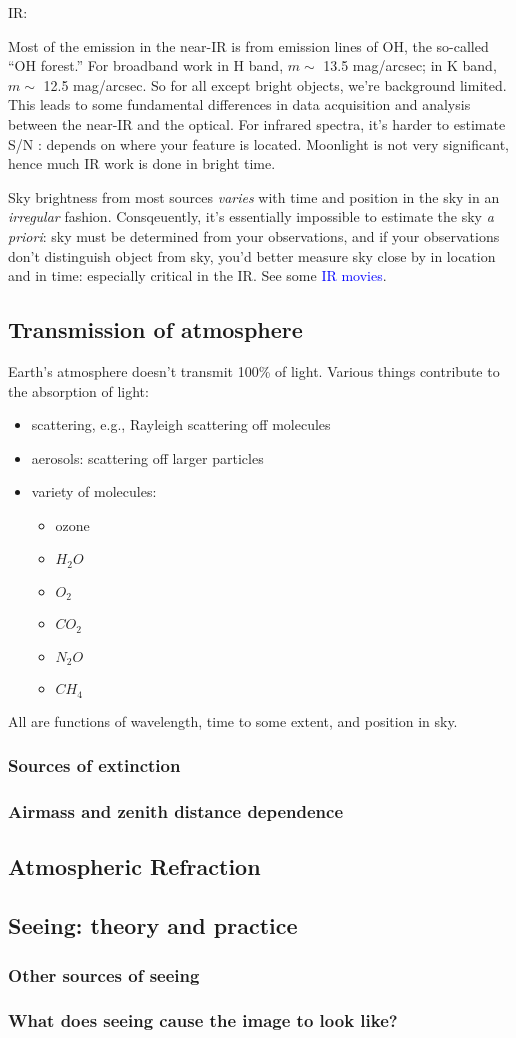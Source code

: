 \documentclass[12pt]{article}
\begin{document}
IR:

Most of the emission in the near-IR is from emission lines of OH, the
so-called ``OH forest.'' For broadband work in H band, $m\sim$ 13.5
mag/arcsec; in K band, $m\sim$ 12.5 mag/arcsec. So for all except
bright objects, we're background limited. This leads to some
fundamental differences in data acquisition and analysis between the
near-IR and the optical. For infrared spectra, it's harder to estimate
S/N : depends on where your feature is located. Moonlight is not very
significant, hence much IR work is done in bright time.

Sky brightness from most sources \emph{varies} with time and position in the
sky in an \emph{irregular} fashion. Consqeuently, it's essentially impossible
to estimate the sky \emph{a priori}: sky must be determined from your
observations, and if your observations don't distinguish object from
sky, you'd better measure sky close by in location and in time:
especially critical in the IR. See some
{\textcolor{blue}{IR movies}}.

\subsection{Transmission of atmosphere}
Earth's atmosphere doesn't transmit 100\% of light. Various things
contribute to the absorption of light:
\begin{itemize}
    \item scattering, e.g., Rayleigh scattering off molecules
    \item aerosols: scattering off larger particles
    \item variety of molecules:
    \begin{itemize}
        \item ozone
        \item $H_2O$
        \item $O_2$
        \item $CO_2$
        \item $N_2O$
        \item $CH_4$
    \end{itemize}
\end{itemize}
All are functions of wavelength, time to some extent, and position in
sky.

\subsubsection{Sources of extinction}
\subsubsection{Airmass and zenith distance dependence}

\subsection{Atmospheric Refraction}
\subsection{Seeing: theory and practice}
\subsubsection{Other sources of seeing}
\subsubsection{What does seeing cause the image to look like?}
\end{document}
